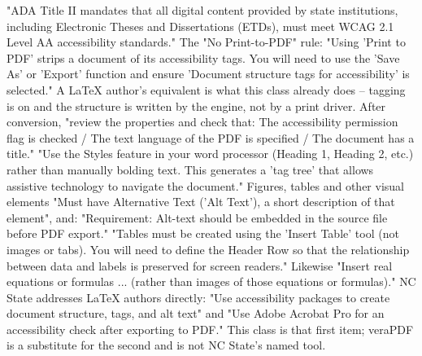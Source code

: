 %
%
\thesisrequiretagging
\thesisrequiredocumentlanguage
{}
	{"ADA Title II mandates that all digital content provided by state
	 institutions, including Electronic Theses and Dissertations (ETDs), must
	 meet WCAG 2.1 Level AA accessibility standards."}
	{The "No Print-to-PDF" rule: "Using 'Print to PDF' strips a document of its
	 accessibility tags. You will need to use the 'Save As' or 'Export' function
	 and ensure 'Document structure tags for accessibility' is selected." A
	 LaTeX author's equivalent is what this class already does -- tagging is on
	 and the structure is written by the engine, not by a print driver.}
	{After conversion, "review the properties and check that: The accessibility
	 permission flag is checked / The text language of the PDF is specified /
	 The document has a title."}
	{"Use the Styles feature in your word processor (Heading 1, Heading 2, etc.)
	 rather than manually bolding text. This generates a 'tag tree' that allows
	 assistive technology to navigate the document."}
	{Figures, tables and other visual elements "Must have Alternative Text
	 ('Alt Text'), a short description of that element", and: "Requirement:
	 Alt-text should be embedded in the source file before PDF export."}
	{"Tables must be created using the 'Insert Table' tool (not images or tabs).
	 You will need to define the Header Row so that the relationship between
	 data and labels is preserved for screen readers." Likewise "Insert real
	 equations or formulas ... (rather than images of those equations or
	 formulas)."}
	{NC State addresses LaTeX authors directly: "Use accessibility packages to
	 create document structure, tags, and alt text" and "Use Adobe Acrobat Pro
	 for an accessibility check after exporting to PDF." This class is that
	 first item; veraPDF is a substitute for the second and is not NC State's
	 named tool.}

